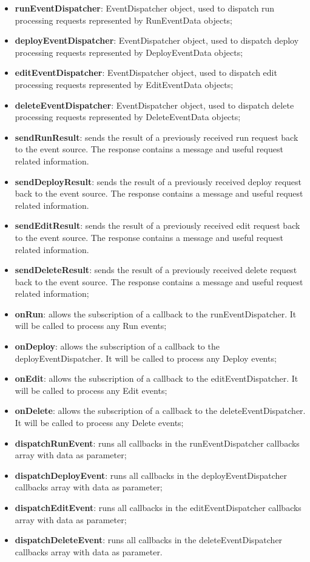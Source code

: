 	\begin{itemize}
		\item \textbf{runEventDispatcher}: EventDispatcher object, used to dispatch run processing requests represented by RunEventData objects;
		\item \textbf{deployEventDispatcher}: EventDispatcher object, used to dispatch deploy processing requests represented by DeployEventData objects;
		\item \textbf{editEventDispatcher}: EventDispatcher object, used to dispatch edit processing requests represented by EditEventData objects;
		\item \textbf{deleteEventDispatcher}: EventDispatcher object, used to dispatch delete processing requests represented by DeleteEventData objects;
	\end{itemize}
	\begin{itemize}
		\item \textbf{sendRunResult}: sends the result of a previously received run request back to the event source. The response contains a message and useful request related information.
		\item \textbf{sendDeployResult}: sends the result of a previously received deploy request back to the event source. The response contains a message and useful request related information.
		\item \textbf{sendEditResult}: sends the result of a previously received edit request back to the event source. The response contains a message and useful request related information.
		\item \textbf{sendDeleteResult}: sends the result of a previously received delete request back to the event source. The response contains a message and useful request related information;
		\item \textbf{onRun}: allows the subscription of a callback to the runEventDispatcher. It will be called to process any Run events;
		\item \textbf{onDeploy}: allows the subscription of a callback to the deployEventDispatcher. It will be called to process any Deploy events;
		\item \textbf{onEdit}: allows the subscription of a callback to the editEventDispatcher. It will be called to process any Edit events;
		\item \textbf{onDelete}: allows the subscription of a callback to the deleteEventDispatcher. It will be called to process any Delete events;
		\item \textbf{dispatchRunEvent}: runs all callbacks in the runEventDispatcher callbacks array with data as parameter;
		\item \textbf{dispatchDeployEvent}: runs all callbacks in the deployEventDispatcher callbacks array with data as parameter;
		\item \textbf{dispatchEditEvent}: runs all callbacks in the editEventDispatcher callbacks array with data as parameter;
		\item \textbf{dispatchDeleteEvent}: runs all callbacks in the deleteEventDispatcher callbacks array with data as parameter.
	\end{itemize}
